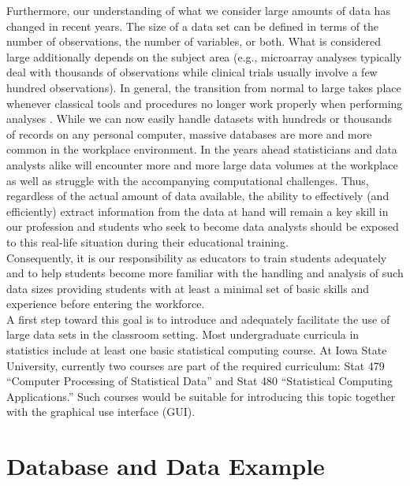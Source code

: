 \documentclass[11pt]{tise_style}
\begin{document}
Furthermore, our understanding of what we consider large amounts of data has changed in recent years. The size of a data set can be defined in terms of the number of observations, the number of variables, or both. What is considered large additionally depends on the subject area (e.g., microarray analyses typically deal with thousands of observations while clinical trials usually involve a few hundred observations). In general, the transition from normal to large takes place whenever classical tools and procedures no longer work properly when performing analyses \citep{theus:2008}. 
While we can now easily handle datasets with hundreds or thousands of records on any personal computer,  massive databases are more and more common in the workplace environment. In the years ahead statisticians and data analysts alike will encounter more and more large data volumes at the workplace as well as struggle with the accompanying computational challenges.  Thus, regardless of the actual amount of data available, the ability to effectively (and efficiently) extract information from the data at hand will remain a key skill in our profession and students who seek to become data analysts should be exposed to this real-life situation during their educational training.\\
Consequently, it is our responsibility as educators to train students adequately and to help students  become more familiar with the handling and analysis of such data sizes providing students with at least a minimal set of basic skills and experience before entering the workforce. \\
A first step toward this goal is to introduce and adequately facilitate the use of large data sets  in the classroom setting. Most undergraduate curricula in statistics include at least one basic statistical computing course. At Iowa State University, currently two courses are part of the required curriculum: Stat 479 ``Computer Processing of Statistical Data'' and Stat 480 ``Statistical Computing Applications.''  Such courses would be suitable for introducing this topic together with the graphical use interface (GUI).  



\section{Database and Data Example}
\end{document}
